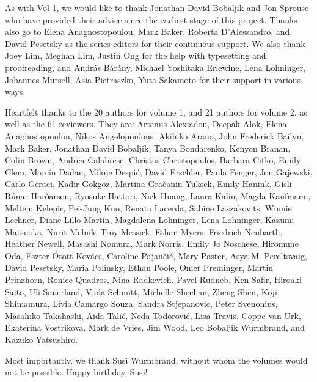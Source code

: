 \begin{refsection}


As with Vol 1, we would like to thank Jonathan David Bobaljik and Jon Sprouse who have provided their advice since the earliest stage of this project. 
Thanks also go to Elena Anagnostopoulou, Mark Baker, Roberta D'Alessandro, and David Pesetsky as the series editors for their continuous support. 
We also thank Joey Lim, Meghan Lim, Justin Ong for the help with typesetting and proofreading, and András Bárány, Michael Yoshitaka Erlewine, Lena Lohninger, Johannes Mursell, Asia Pietraszko, Yuta Sakamoto for their support in various ways.

\begin{sloppypar}
Heartfelt thanks to the 20 authors for volume 1, and 21 authors for volume 2, as well as the 61 reviewers. They are: 
Artemis Alexiadou, 
Deepak Alok, 
Elena Anagnostopoulou, 
Nikos Angelopoulous, 
Akihiko Arano, 
John Frederick Bailyn, 
Mark Baker, 
Jonathan David Bobaljik, 
Tanya Bondarenko, 
Kenyon Branan, 
Colin Brown, 
Andrea Calabrese, 
Christos Christopoulos, 
Barbara Citko, 
Emily Clem, 
Marcin Dadan, 
Miloje Despić, 
David Erschler, 
Paula Fenger, 
Jon Gajewski, 
Carlo Geraci, 
Kadir Gökgöz, 
Martina Gračanin-Yuksek, 
Emily Hanink, 
Gísli Rúnar Harðarson, 
Ryosuke Hattori, 
Nick Huang, 
Laura Kalin, 
Magda Kaufmann, 
Meltem Kelepir, 
Pei-Jung Kuo, 
Renato Lacerda, 
Sabine Laszakovits, 
Winnie Lechner, 
Diane Lillo-Martin, 
Magdalena Lohninger, 
Lena Lohninger, 
Kazumi Matsuoka, 
Nurit Melnik, 
Troy Messick, 
Ethan Myers, 
Friedrich Neubarth, 
Heather Newell, 
Masashi Nomura, 
Mark Norris, 
Emily Jo Noschese, 
Hiromune Oda, 
Eszter Ótott-Kovács, 
Caroline Pajančič, 
Mary Paster, 
Asya M. Pereltsvaig, 
David Pesetsky, 
Maria Polinsky, 
Ethan Poole, 
Omer Preminger, 
Martin Prinzhorn, 
Ronice Quadros, 
Nina Radkevich, 
Pavel Rudneb, 
Ken Safir, 
Hiroaki Saito, 
Uli Sauerland, 
Viola Schmitt, 
Michelle Sheehan, 
Zheng Shen, 
Koji Shimamura, 
Livia Camargo Souza, 
Sandra Stjepanovic, 
Peter Svenonius, 
Masahiko Takahashi, 
Aida Talić, 
Neda Todorović, 
Lisa Travis, 
Coppe van Urk, 
Ekaterina Vostrikova, 
Mark de Vries, 
Jim Wood, 
Leo Bobaljik Wurmbrand, and 
Kazuko Yatsushiro.
\end{sloppypar}


Most importantly, we thank Susi Wurmbrand, without whom the volumes would not be possible. Happy birthday, Susi!

\begin{comment}
Jonathan Bobaljik
Jon Sprouse
Zheng's students who did typesetting

Reviewers (by name?)

Lena Lohninger: for providing the email of Valentin Panzirsch
Elena Anagnostopoulou: for providing the email address of Athanasios
Yuta Sakamoto: for finding email addresses
\end{comment}

\printbibliography[heading=subbibliography]
\end{refsection}

